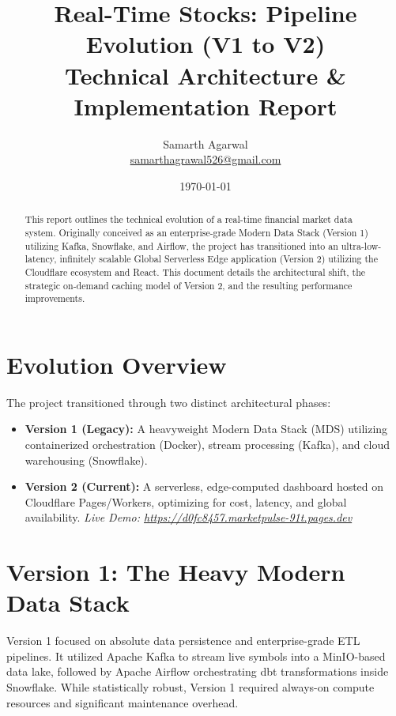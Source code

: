 \documentclass[12pt,a4paper]{article}
\begin{document}
\title{\textbf{Real-Time Stocks: Pipeline Evolution (V1 to V2)} \\ \Large Technical Architecture \& Implementation Report}
\author{Samarth Agarwal \\ \href{mailto:samarthagrawal526@gmail.com}{samarthagrawal526@gmail.com}}
\date{\today}

\maketitle

\begin{abstract}
This report outlines the technical evolution of a real-time financial market data system. Originally conceived as an enterprise-grade Modern Data Stack (Version 1) utilizing Kafka, Snowflake, and Airflow, the project has transitioned into an ultra-low-latency, infinitely scalable Global Serverless Edge application (Version 2) utilizing the Cloudflare ecosystem and React. This document details the architectural shift, the strategic on-demand caching model of Version 2, and the resulting performance improvements.
\end{abstract}

\vspace{1cm}
\tableofcontents
\newpage

\section{Evolution Overview}
The project transitioned through two distinct architectural phases:
\begin{itemize}
    \item \textbf{Version 1 (Legacy):} A heavyweight Modern Data Stack (MDS) utilizing containerized orchestration (Docker), stream processing (Kafka), and cloud warehousing (Snowflake).
    \item \textbf{Version 2 (Current):} A serverless, edge-computed dashboard hosted on Cloudflare Pages/Workers, optimizing for cost, latency, and global availability. \textit{Live Demo: \url{https://d0fc8457.marketpulse-91t.pages.dev}}
\end{itemize}

\section{Version 1: The Heavy Modern Data Stack}
Version 1 focused on absolute data persistence and enterprise-grade ETL pipelines. It utilized Apache Kafka to stream live symbols into a MinIO-based data lake, followed by Apache Airflow orchestrating dbt transformations inside Snowflake. While statistically robust, Version 1 required always-on compute resources and significant maintenance overhead.
\end{document}

